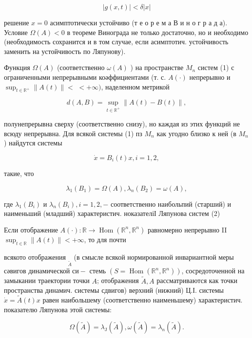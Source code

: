\documentclass[10pt]{article}
\begin{document}
\[

|g(x, t)|<\delta|x|

\]



решение $x=0$ асимптотически устойчиво (т е о р е м а В и н о г р а д а). Условие $\Omega(A)<0$ в теореме Винограда не только достаточно, но и необходимо (необходимость сохранится и в том случае, если асимптотич. устойчивость заменить на устойчивость по Ляпунову).



Функция $\Omega(A)$ (соответственно $\omega(A)$ ) на пространстве $M_{n}$ систем (1) с ограниченными непрерывными коәффициентами (т. с. $A(\cdot)$ непрерывно и $\sup _{t \in \mathbb{R}^{+}}\|A(t)\|<$ $<+\infty)$, наделенном метрикой



\[

d(A, B)=\sup _{t \in \mathbb{R}^{+}}\|A(t)-B(t)\|,

\]



полунепрерывна сверху (соответственно снизу), но каждая из этих функций не всюду непрерывна. Для всякой системы (1) пз $M_{n}$ как угодно близко к ней (в $M_{n}$ ) найдутся системы



\[

\dot{x}=B_{i}(t) x, i=1,2,

\]



такие, что



\[

\lambda_{1}\left(B_{1}\right)=\Omega(A), \lambda_{n}\left(B_{2}\right)=\omega(A),

\]



где $\lambda_{1}\left(B_{i}\right)$ и $\lambda_{n}\left(B_{i}\right), i=1,2,-$ соответственно наибольпий (старший) и наименьший (младший) характеристич. ноказателіІ Ляпунова систем (2)



Если отображение $A(\cdot): \mathbb{R} \rightarrow \operatorname{Hom}\left(\mathbb{R}^{n}, \mathbb{R}^{n}\right)$ равномерно непрерывно II $\sup _{t \in \mathbb{R}}\|A(t)\|<+\infty$, то для почти



всякото отображения $\underset{\tilde{A}}{ }$ (в смысле всякой нормированной инвариантной меры сәвигов динамической $с и-$ стемь $\left(S=\operatorname{Hom}\left(\mathbb{R}^{n}, \mathbb{R}^{n}\right)\right)$, сосредоточенной на замыкании траектории точки $A$; отображения $\tilde{A}, A$ рассматриваются как точки пространства динамич. системы сдвигов) верхний (нижний) Ц.І. системы $\dot{x}=\tilde{A}(t) x$ равен наибольшему (соответственно наименьшему) характеристич. показателю Ляпунова этой системы:



\[

\Omega(\tilde{A})=\lambda_{\mathrm{J}}(\tilde{A}), \omega(\tilde{A})=\lambda_{n}(\tilde{A}) .

\]
\end{document}
